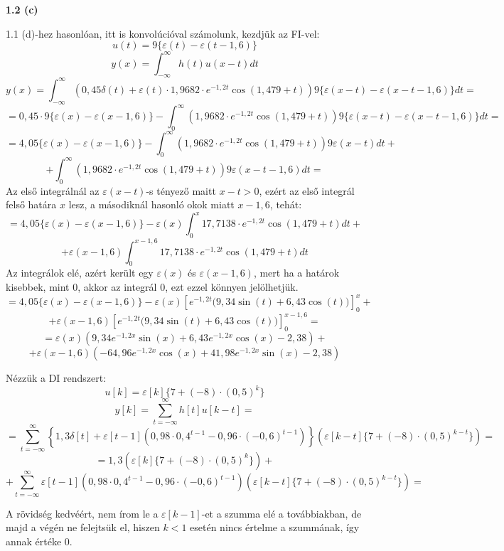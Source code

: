 \documentclass[12pt,a4paper]{article}
\begin{document}
\textbf{1.2 (c)}

1.1 (d)-hez hasonlóan, itt is konvolúcióval számolunk, kezdjük az FI-vel:
\[u(t) = 9\{\varepsilon(t)-\varepsilon(t-1,6)\}\]
\[y(x) = \int_{-\infty}^{\infty} h(t)u(x-t) dt\]
\[y(x) = \int_{-\infty}^{\infty} \left(0,45\delta(t) + \varepsilon(t)\cdot 1,9682\cdot e^{-1,2t}\cos(1,479+t)\right)9\{\varepsilon(x-t)-\varepsilon(x-t-1,6)\} dt = \]
\[= 0,45\cdot9\{\varepsilon(x)-\varepsilon(x-1,6)\} - \int_0^{\infty}\left(1,9682\cdot e^{-1,2t}\cos(1,479+t)\right)9\{\varepsilon(x-t)-\varepsilon(x-t-1,6)\} dt = \]
\[= 4,05\{\varepsilon(x)-\varepsilon(x-1,6)\} - \int_0^{\infty}\left(1,9682\cdot e^{-1,2t}\cos(1,479+t)\right)9\varepsilon(x-t) dt +\]
\[+ \int_0^{\infty}\left(1,9682\cdot e^{-1,2t}\cos(1,479+t)\right)9\varepsilon(x-t-1,6) dt = \]
Az első integrálnál az $\varepsilon(x-t)$-s tényező maitt $x-t > 0$, ezért az első integrál felső határa $x$ lesz, a másodiknál hasonló okok miatt $x-1,6$, tehát: 
\[= 4,05\{\varepsilon(x)-\varepsilon(x-1,6)\} - \varepsilon(x)\int_0^{x}17,7138\cdot e^{-1,2t}\cos(1,479+t) dt + \]
\[+ \varepsilon(x-1,6)\int_0^{x-1,6}17,7138\cdot e^{-1,2t}\cos(1,479+t) dt\]
Az integrálok elé, azért került egy $\varepsilon(x)$ és $\varepsilon(x-1,6)$, mert ha a határok kisebbek, mint 0, akkor az integrál 0, ezt ezzel könnyen jelölhetjük.
\[= 4,05\{\varepsilon(x)-\varepsilon(x-1,6)\} - \varepsilon(x)\left[e^{-1,2 t} \big(9,34 \sin(t)+6,43 \cos(t)\big)\right]_0^{x} + \]
\[+ \varepsilon(x-1,6)\left[e^{-1,2 t} \big(9,34 \sin(t)+6,43 \cos(t)\big)\right]_0^{x-1,6} = \]
\[= \boxed{\varepsilon(x)\left(9,34 e^{-1,2 x} \sin(x)+6,43 e^{-1,2 x} \cos(x)-2,38
\right) +}\]
\[+ \boxed{\varepsilon(x-1,6)\left(-64,96 e^{-1,2 x} \cos(x)+41,98 e^{-1,2 x} \sin(x)-2,38
\right)}\]

Nézzük a DI rendszert:
\[u[k] = \varepsilon[k]\{7 + (-8)\cdot(0,5)^k\}\]
\[y[k] = \sum_{t=-\infty}^{\infty} h[t]u[k-t] = \]
\[= \sum_{t=-\infty}^{\infty}\left\{1,3\delta[t]+\varepsilon[t-1]\left(0,98\cdot 0,4^{t-1}-0,96\cdot (-0,6)^{t-1}\right)\right\}\left(\varepsilon[k-t]\{7 + (-8)\cdot(0,5)^{k-t}\}\right) = \]
\[= 1,3\left(\varepsilon[k]\{7 + (-8)\cdot(0,5)^{k}\}\right) + \]
\[+ \sum_{t=-\infty}^{\infty}\varepsilon[t-1]\left(0,98\cdot 0,4^{t-1}-0,96\cdot (-0,6)^{t-1}\right)\left(\varepsilon[k-t]\{7 + (-8)\cdot(0,5)^{k-t}\}\right) = \]

A rövidség kedvéért, nem írom le a $\varepsilon[k-1]$-et a szumma elé a továbbiakban, de majd a végén ne felejtsük el, hiszen $k<1$ esetén nincs értelme a szummának, így annak értéke 0.
\end{document}
